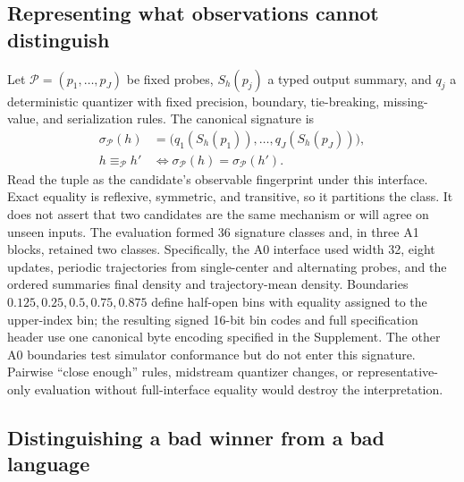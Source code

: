\documentclass[10pt]{article}
\theoremstyle{definition}
\begin{document}
\subsection{Representing what observations cannot distinguish}

Let \(\mathcal P=(p_1,\ldots,p_J)\) be fixed probes, \(S_h(p_j)\) a typed output summary, and
\(q_j\) a deterministic quantizer with fixed precision, boundary, tie-breaking, missing-value,
and serialization rules. The canonical signature is
\begin{equation}
\begin{aligned}
\sigma_{\mathcal P}(h)
&=\big(q_1(S_h(p_1)),\ldots,q_J(S_h(p_J))\big),\\
h\equiv_{\mathcal P}h'
&\Longleftrightarrow \sigma_{\mathcal P}(h)=\sigma_{\mathcal P}(h').
\end{aligned}
\label{eq:signature}
\end{equation}
Read the tuple as the candidate's observable fingerprint under this interface. Exact equality is
reflexive, symmetric, and transitive, so it partitions the class. It does not assert that two
candidates are the same mechanism or will agree on unseen inputs. The evaluation formed 36
signature classes and, in three A1 blocks, retained two classes. Specifically, the A0 interface
used width 32, eight updates, periodic trajectories from single-center and alternating probes,
and the ordered summaries final density and trajectory-mean density. Boundaries
\(0.125,0.25,0.5,0.75,0.875\) define half-open bins with equality assigned to the upper-index bin;
the resulting signed 16-bit bin codes and full specification header use one canonical byte
encoding specified in the Supplement. The other A0 boundaries test simulator
conformance but do not enter this signature. Pairwise ``close enough'' rules,
midstream quantizer changes, or representative-only evaluation without full-interface equality
would destroy the interpretation.

\subsection{Distinguishing a bad winner from a bad language}
\end{document}
